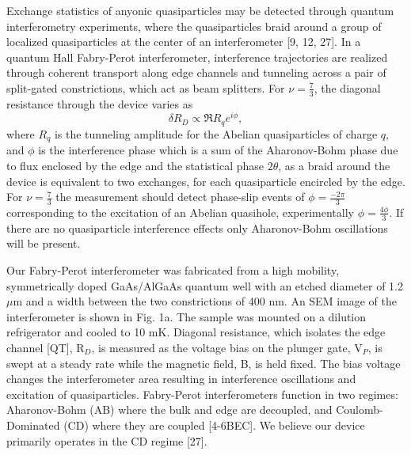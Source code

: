 \documentclass[]{article}
\begin{document}
	
Exchange statistics of anyonic quasiparticles may be detected through quantum interferometry experiments, where the quasiparticles braid around a group of localized quasiparticles at the center of an interferometer [9, 12, 27]. In a quantum Hall Fabry-Perot interferometer, interference trajectories are realized through coherent transport along edge channels and tunneling across a pair of split-gated constrictions, which act as beam splitters. For $\nu = \frac{7}{3}$, the diagonal resistance through the device varies as 
\begin{equation}
\delta R_D \propto \Re{R_{q}e^{i\phi}},
\end{equation}
where $R_{q}$ is the tunneling amplitude for the Abelian quasiparticles of charge $q$, and $\phi$ is the interference phase which is a sum of the Aharonov-Bohm phase due to flux enclosed by the edge and the statistical phase $2\theta$, as a braid around the device is equivalent to two exchanges, for each quasiparticle encircled by the edge. For $\nu=\frac{7}{3}$ the measurement should detect phase-slip events of $\phi = \frac{-2\pi}{3}$ corresponding to the excitation of an Abelian quasihole, experimentally $\phi=\frac{4\phi}{3}$. If there are no quasiparticle interference effects only Aharonov-Bohm oscillations will be present. 


	Our Fabry-Perot interferometer was fabricated from a high mobility, symmetrically doped GaAs/AlGaAs quantum well with an etched diameter of 1.2 $\mu$m and a width between the two constrictions of 400 nm. An SEM image of the interferometer is shown in Fig. 1a. The sample was mounted on a dilution refrigerator and cooled to 10 mK. Diagonal resistance, which isolates the edge channel [QT],   R$_D$, is measured as the voltage bias on the plunger gate, V$_P$, is swept at a steady rate while the magnetic field, B, is held fixed. The bias voltage changes the interferometer area resulting in interference oscillations and excitation of quasiparticles. Fabry-Perot interferometers function in two regimes: Aharonov-Bohm (AB) where the bulk and edge are decoupled, and Coulomb-Dominated (CD) where they are coupled [4-6BEC]. We believe our device primarily operates in the CD regime [27].
	
\end{document}
